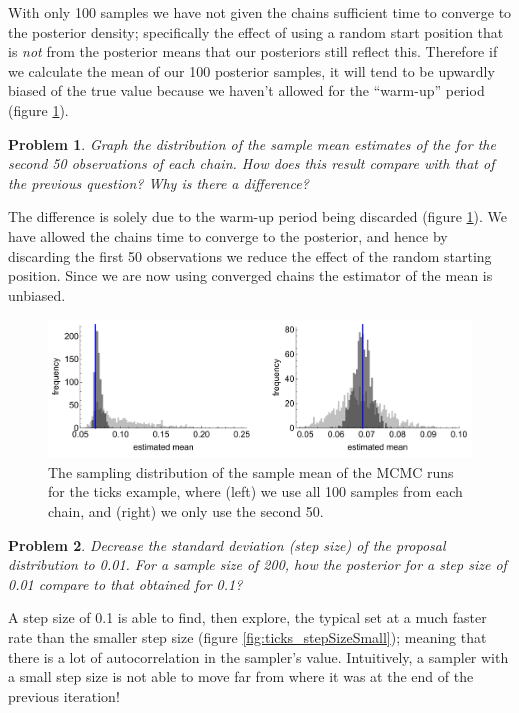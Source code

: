 \documentclass{article}
\newtheorem{problem}{Problem}[section]
\begin{document}
With only 100 samples we have not given the chains sufficient time to converge to the posterior density; specifically the effect of using a random start position that is \textit{not} from the posterior means that our posteriors still reflect this. Therefore if we calculate the mean of our 100 posterior samples, it will tend to be upwardly biased of the true value because we haven't allowed for the ``warm-up'' period (figure \ref{fig:ticks_warmup}). 

\begin{problem}
Graph the distribution of the sample mean estimates of the  for the second 50 observations of each chain. How does this result compare with that of the previous question? Why is there a difference?
\end{problem}

The difference is solely due to the warm-up period being discarded (figure \ref{fig:ticks_warmup}). We have allowed the chains time to converge to the posterior, and hence by discarding the first 50 observations we reduce the effect of the random starting position. Since we are now using converged chains the estimator of the mean is unbiased.

\begin{figure}[ht]
\centerline{\includegraphics[width=1\textwidth]{../figures/prob3_ticksMCMCMean.pdf}}
\caption{The sampling distribution of the sample mean of the MCMC runs for the ticks example, where (left) we use all 100 samples from each chain, and (right) we only use the second 50.}\label{fig:ticks_warmup}
\end{figure}

\begin{problem}
Decrease the standard deviation (step size) of the proposal distribution to 0.01. For a sample size of 200, how the posterior for a step size of 0.01 compare to that obtained for 0.1?
\end{problem}

A step size of 0.1 is able to find, then explore, the typical set at a much faster rate than the smaller step size (figure \ref{fig:ticks_stepSizeSmall}); meaning that there is a lot of autocorrelation in the sampler's value. Intuitively, a sampler with a small step size is not able to move far from where it was at the end of the previous iteration!
\end{document}
